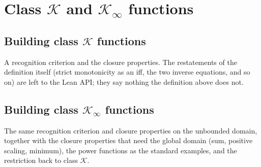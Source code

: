\section{Class \texorpdfstring{$\mathcal{K}$}{K} and \texorpdfstring{$\mathcal{K}_{\infty}$}{Kinfty} functions}



\subsection{Building class \texorpdfstring{$\mathcal{K}$}{K} functions}

A recognition criterion and the closure properties. The restatements of the definition itself
(strict monotonicity as an iff, the two inverse equations, and so on) are left to the Lean API;
they say nothing the definition above does not.








\subsection{Building class \texorpdfstring{$\mathcal{K}_{\infty}$}{Kinfty} functions}

The same recognition criterion and closure properties on the unbounded domain, together with the
closure properties that need the global domain (sum, positive scaling, minimum), the power
functions as the standard examples, and the restriction back to class $\mathcal{K}$.







